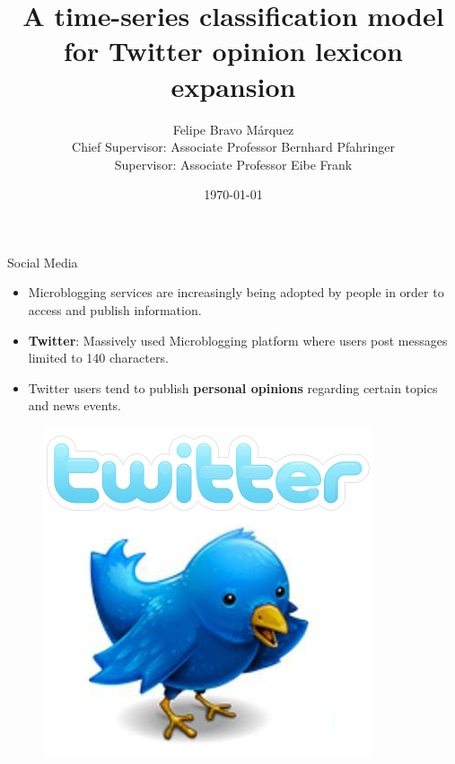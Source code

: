\documentclass[handout]{beamer}
\title{A time-series classification model for Twitter opinion lexicon expansion}
\author[Felipe Bravo Márquez]{\footnotesize
 \textcolor[rgb]{0.00,0.00,1.00}{Felipe Bravo Márquez} \\ Chief Supervisor: Associate Professor Bernhard Pfahringer \\  Supervisor: Associate Professor Eibe Frank}
\institute{University of Waikato \\ Computer Science Department }
\date{ \today }
\begin{document}
\begin{frame}
\titlepage


\end{frame}





\begin{frame}{Social Media}
\begin{scriptsize}
\begin{itemize}
 \item Microblogging services are increasingly being adopted by people in order to access and publish information.  
 \item \textbf{Twitter}: Massively used Microblogging platform where users post messages limited to 140 characters. 
 \item Twitter users tend to publish \textbf{personal opinions} regarding certain topics and news events. 
\end{itemize}
  \begin{figure}[h]
        	\includegraphics[scale = 0.2]{pics/twitter.png}
        \end{figure}

\end{scriptsize}
\end{frame}
\end{document}
